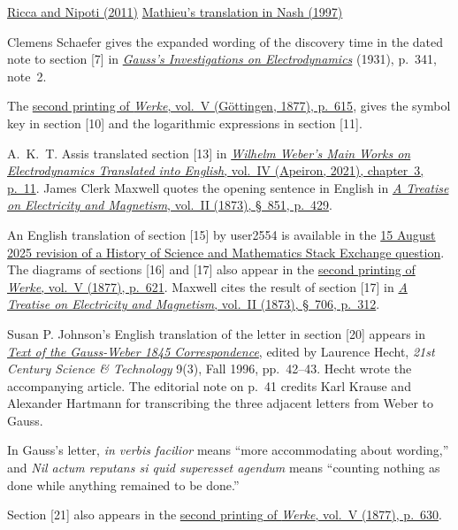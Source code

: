 \medskip\noindent
\href{https://webhomes.maths.ed.ac.uk/~v1ranick/papers/ricca.pdf#page=3}{Ricca and Nipoti (2011)}\quad
\href{https://arxiv.org/abs/hep-th/9709135v3}{Mathieu’s translation in Nash (1997)}
\par\medskip\noindent Clemens Schaefer gives the expanded wording of the discovery time in the dated note to section [7] in \href{https://www.nature.com/articles/128339a0}{\textit{Gauss’s Investigations on Electrodynamics}} (1931), p.~341, note~2.
\par\medskip\noindent The \href{https://archive.org/details/Werkecarlf05gausrich/page/615/mode/1up}{second printing of \textit{Werke}, vol.~V (Göttingen, 1877), p.~615}, gives the symbol key in section [10] and the logarithmic expressions in section [11].
\par\medskip\noindent A.~K.~T. Assis translated section [13] in \href{https://www.ifi.unicamp.br/~assis/Weber-in-English-Vol-4.pdf#page=14}{\textit{Wilhelm Weber’s Main Works on Electrodynamics Translated into English}, vol.~IV (Apeiron, 2021), chapter~3, p.~11}. James Clerk Maxwell quotes the opening sentence in English in \href{https://en.wikisource.org/wiki/Page:A_Treatise_on_Electricity_and_Magnetism_-_Volume_2.djvu/461}{\textit{A Treatise on Electricity and Magnetism}, vol.~II (1873), §~851, p.~429}.
\par\medskip{}\noindent An English translation of section [15] by user2554 is available in the \href{https://hsm.stackexchange.com/questions/7503/several-questions-about-gausss-contributions-to-electromagnetism}{15 August 2025 revision of a History of Science and Mathematics Stack Exchange question}. The diagrams of sections [16] and [17] also appear in the \href{https://archive.org/details/Werkecarlf05gausrich/page/621/mode/1up}{second printing of \textit{Werke}, vol.~V (1877), p.~621}. Maxwell cites the result of section [17] in \href{https://en.wikisource.org/wiki/Page:A_Treatise_on_Electricity_and_Magnetism_-_Volume_2.djvu/344}{\textit{A Treatise on Electricity and Magnetism}, vol.~II (1873), §~706, p.~312}.
\par\medskip\noindent Susan P. Johnson’s English translation of the letter in section [20] appears in \href{https://21sci-tech.com/articles/Atomic_Science.pdf#page=22}{\textit{Text of the Gauss-Weber 1845 Correspondence}}, edited by Laurence Hecht, \textit{21st Century Science \& Technology} 9(3), Fall 1996, pp.~42--43. Hecht wrote the accompanying article. The editorial note on p.~41 credits Karl Krause and Alexander Hartmann for transcribing the three adjacent letters from Weber to Gauss.
\par\smallskip\noindent In Gauss’s letter, \textit{in verbis facilior} means “more accommodating about wording,” and \textit{Nil actum reputans si quid superesset agendum} means “counting nothing as done while anything remained to be done.”
\par\smallskip\noindent Section [21] also appears in the \href{https://archive.org/download/Werkecarlf05gausrich/page/n641}{second printing of \textit{Werke}, vol.~V (1877), p.~630}.
\clearpage
